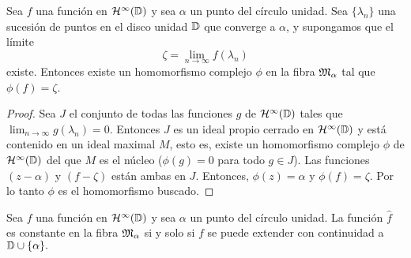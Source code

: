 \begin{comment}
Sabemos que existe una correspondencia uno a uno entre los homomorfismos $\phi$ de $\bholomorphic{\disk}$ en el álgebra de los números complejos y los ideales maximales $M$ en el álgebra $\bholomorphic{\disk}$. Esta correspondencia está definida por $M = \ker (\phi)$. Cada ideal maximal $M$ es cerrado, así que cada homomorfismo $\phi$ es continuo:
\begin{equation*}
    \abs{\phi (x)} \leq \norm{x}.
\end{equation*}

$\fiber$ es un subconjunto del espacio conjugado $B^*$, y de hecho está contenido en la esfera unidad de $B^*$. Además, $\fiber (B)$ es cerrado en la topología débil estrella en $B^*$.
\end{comment}


\begin{theorem}
    \label{result1}
    Sea $f$ una función en $\mathcal{H}^{\infty}(\mathbb{D})$ y sea $\alpha$ un punto del círculo unidad. Sea $\{\lambda_n\}$ una sucesión de puntos en el disco unidad $\mathbb{D}$ que converge a $\alpha$, y supongamos que el límite
    \begin{equation*}
        \zeta = \lim_{n \rightarrow \infty} f(\lambda_n)
    \end{equation*}
    existe. Entonces existe un homomorfismo complejo $\phi$ en la fibra $\mathfrak{M}_\alpha$ tal que $\phi(f) = \zeta$.
\end{theorem}

\begin{proof}
    Sea $J$ el conjunto de todas las funciones $g$ de $\mathcal{H}^{\infty}(\mathbb{D})$ tales que $\lim_{n \rightarrow \infty} g(\lambda_n) = 0.$ Entonces $J$ es un ideal propio cerrado en $\mathcal{H}^{\infty}(\mathbb{D})$ y está contenido en un ideal maximal $M$, esto es, existe un homomorfismo complejo $\phi$ de  $\mathcal{H}^{\infty}(\mathbb{D})$ del que $M$ es el núcleo ($\phi(g) = 0$ para todo $g \in J$). Las funciones $(z - \alpha)$ y $(f - \zeta)$ están ambas en $J$. Entonces, $\phi(z) = \alpha$ y $\phi(f) = \zeta$. Por lo tanto $\phi$ es el homomorfismo buscado.
\end{proof}

\begin{theorem}
    Sea $f$ una función en $\mathcal{H}^{\infty}(\mathbb{D})$ y sea $\alpha$ un punto del círculo unidad. La función $\hat f$ es constante en la fibra $\mathfrak{M}_\alpha$ si y solo si $f$ se puede extender con continuidad a $\mathbb{D} \cup \{\alpha\}.$
\end{theorem}

